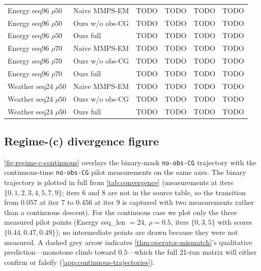 \documentclass{article}
\theoremstyle{plain}
\theoremstyle{definition}
\theoremstyle{remark}
\begin{document}
\begin{table}[h]
{\begin{tabular}{l|l|cccc}
\midrule
Energy seq96 $\rho50$ & Naive MMPS-EM & TODO & TODO & TODO & TODO \\
Energy seq96 $\rho50$ & Ours w/o obs-CG & TODO & TODO & TODO & TODO \\
Energy seq96 $\rho50$ & Ours full       & TODO & TODO & TODO & TODO \\
\midrule
Energy seq96 $\rho70$ & Naive MMPS-EM & TODO & TODO & TODO & TODO \\
Energy seq96 $\rho70$ & Ours w/o obs-CG & TODO & TODO & TODO & TODO \\
Energy seq96 $\rho70$ & Ours full       & TODO & TODO & TODO & TODO \\
\midrule
Weather seq24 $\rho50$ & Naive MMPS-EM & TODO & TODO & TODO & TODO \\
Weather seq24 $\rho50$ & Ours w/o obs-CG & TODO & TODO & TODO & TODO \\
Weather seq24 $\rho50$ & Ours full       & TODO & TODO & TODO & TODO \\
\bottomrule
\end{tabular}
}
\end{table}

\subsection{Regime-(c) divergence figure}
\label{app:continuous-figure}

\cref{fig:regime-c-continuous} overlays the binary-mask \texttt{no-obs-CG} trajectory with the continuous-time \texttt{no-obs-CG} pilot measurements on the same axes. The binary trajectory is plotted in full from \cref{tab:convergence} (measurements at iters $\{0,1,2,3,4,5,7,9\}$; iters $6$ and $8$ are not in the source table, so the transition from $0.057$ at iter $7$ to $0.456$ at iter $9$ is captured with two measurements rather than a continuous descent). For the continuous case we plot only the three measured pilot points (Energy seq\_len $=24$, $\rho=0.5$, iters $\{0, 3, 5\}$ with scores $\{0.44, 0.47, 0.49\}$); no intermediate points are drawn because they were not measured. A dashed grey arrow indicates \cref{thm:operator-mismatch}'s qualitative prediction---monotone climb toward $0.5$---which the full 21-run matrix will either confirm or falsify (\cref{app:continuous-trajectories}).
\end{document}
